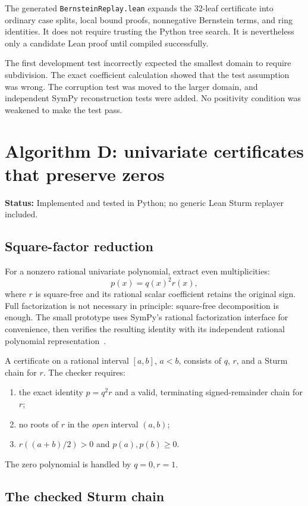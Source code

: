 \documentclass[11pt,a4paper]{article}
\theoremstyle{definition}
\newcommand{\status}[1]{\textbf{Status:} #1.}
\newcommand{\code}[1]{\texttt{#1}}
\begin{document}
The generated \code{BernsteinReplay.lean} expands the 32-leaf certificate into ordinary case splits, local bound proofs, nonnegative Bernstein terms, and ring identities. It does not require trusting the Python tree search. It is nevertheless only a candidate Lean proof until compiled successfully.

The first development test incorrectly expected the smallest domain to require subdivision. The exact coefficient calculation showed that the test assumption was wrong. The corruption test was moved to the larger domain, and independent SymPy reconstruction tests were added. No positivity condition was weakened to make the test pass.

\section{Algorithm D: univariate certificates that preserve zeros}
\status{Implemented and tested in Python; no generic Lean Sturm replayer included}

\subsection{Square-factor reduction}

For a nonzero rational univariate polynomial, extract even multiplicities:
\[
  p(x)=q(x)^2r(x),
\]
where $r$ is square-free and its rational scalar coefficient retains the original sign. Full factorization is not necessary in principle: square-free decomposition is enough. The small prototype uses SymPy's rational factorization interface for convenience, then verifies the resulting identity with its independent rational polynomial representation~\cite{sympy}.

A certificate on a rational interval $[a,b]$, $a<b$, consists of $q$, $r$, and a Sturm chain for $r$. The checker requires:
\begin{enumerate}
\item the exact identity $p=q^2r$ and a valid, terminating signed-remainder chain for $r$;
\item no roots of $r$ in the \emph{open} interval $(a,b)$;
\item $r((a+b)/2)>0$ and $p(a),p(b)\ge0$.
\end{enumerate}
The zero polynomial is handled by $q=0,r=1$.

\subsection{The checked Sturm chain}
\end{document}
